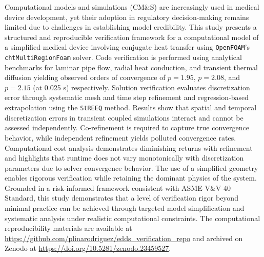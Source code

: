 Computational models and simulations (CM\&S) are increasingly used in medical device development, yet their adoption in regulatory decision-making remains limited due to challenges in establishing model credibility. This study presents a structured and reproducible verification framework for a computational model of a simplified medical device involving conjugate heat transfer using \texttt{OpenFOAM}'s \texttt{chtMultiRegionFoam} solver. Code verification is performed using analytical benchmarks for laminar pipe flow, radial heat conduction, and transient thermal diffusion yielding observed orders of convergence of $p=1.95$, $p=2.08$, and $p=2.15$ (at 0.025 s) respectively. Solution verification evaluates discretization error through systematic mesh and time step refinement and regression-based extrapolation using the \texttt{StREEQ} method. Results show that spatial and temporal discretization errors in transient coupled simulations interact and cannot be assessed independently. Co-refinement is required to capture true convergence behavior, while independent refinement yields polluted convergence rates. Computational cost analysis demonstrates diminishing returns with refinement and highlights that runtime does not vary monotonically with discretization parameters due to solver convergence behavior. The use of a simplified geometry enables rigorous verification while retaining the dominant physics of the system. Grounded in a risk-informed framework consistent with ASME V\&V 40 Standard, this study demonstrates that a level of verification rigor beyond minimal practice can be achieved through targeted model simplification and systematic analysis under realistic computational constraints. The computational reproducibility materials are available at \url{https://github.com/plinarodriguez/edds_verification_repo} and archived on Zenodo at \url{https://doi.org/10.5281/zenodo.23459527}. 

